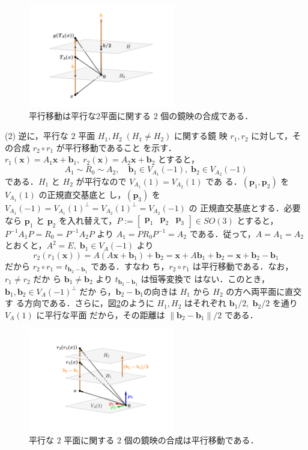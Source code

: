 \documentclass[11pt, uplatex, dvipdfmx, titlepage]{jsarticle}
\makeatletter
\renewenvironment{proof}[1][\proofname]{\par
  \pushQED{\qed}%
  \normalfont \topsep6\p@\@plus6\p@\relax
  \trivlist
  \item[\hskip\labelsep
         \bfseries
    {#1}]\ignorespaces
}{%
  \popQED\endtrivlist\@endpefalse
}
\theoremstyle{definition}
\renewcommand{\proofname}{\textbf{証明}}
\makeatother
\begin{document}
\begin{proof}
  \begin{figure}[h]
    \centering
    \includegraphics[height=4.5cm]{pictures/translation3.pdf}
    \caption{平行移動は平行な2平面に関する $2$ 個の鏡映の合成である．}
    \label{fig:translation3}
  \end{figure}

  \noindent
  (2) 逆に，平行な $2$ 平面 $H_1, H_2 \; (H_1 \neq H_2)$ に関する鏡
  映 $r_1, r_2$ に対して，その合成 $r_2 \circ r_1$ が平行移動であること
  を示す．$r_1(\bm{x})=A_1\bm{x}+\bm{b}_1, \; r_2(\bm{x}) =
  A_2\bm{x}+\bm{b}_2$ とすると，
  \[
    A_1 \sim R_0 \sim A_2, \quad \bm{b}_1 \in V_{A_1}(-1), \; \bm{b}_2 \in V_{A_2}(-1)
  \]
  である．$H_1$ と $H_2$ が平行なので $V_{A_1}(1) = V_{A_2}(1)$ であ
  る．$(\bm{p}_1, \bm{p}_2)$ を $V_{A_1}(1)$ の正規直交基底と
  し，$(\bm{p}_3)$ を
  $V_{A_1}(-1)=V_{A_1}(1)^{\perp} = V_{A_2}(1)^{\perp}=V_{A_2}(-1)$ の
  正規直交基底とする．必要なら $\bm{p}_1$ と $\bm{p}_2$ を入れ替えて，$P:=\left[
    \begin{array}{ccc}
      \bm{p}_1 & \bm{p}_2 & \bm{p}_3
    \end{array}
  \right] \in SO(3)$ とすると，$P^{-1}A_1 P = R_0 = P^{-1}A_2 P$ より $A_1=PR_0P^{-1}=A_2$
  である．従って，$A=A_1= A_2$ とおくと，$A^2= E, \; \bm{b}_1 \in V_{A}(-1)$ より
  \[
    r_2 \left( r_1 (\bm{x})\right) = A\left( A \bm{x}+\bm{b}_1\right) + \bm{b}_2
    = \bm{x} + A \bm{b}_1 + \bm{b}_2 = \bm{x} + \bm{b}_2 - \bm{b}_1
  \]
  だから $r_2 \circ r_1 = t_{\bm{b}_2-\bm{b}_1}$ である．すなわ
  ち，$r_2 \circ r_1$ は平行移動である．なお，$r_1 \neq r_2$ だか
  ら $\bm{b}_1 \neq \bm{b}_2$ より $t_{\bm{b}_2-\bm{b}_1}$ は恒等変換で
  はない．このとき，$\bm{b}_1, \bm{b}_2 \in V_{A}(-1)^{\perp}$ だか
  ら，$\bm{b}_2-\bm{b}_1$の向きは $H_1$ から $H_2$ の方へ両平面に直交す
  る方向である．さらに，図\ref{fig:translation3gen}のように $H_1, H_2$
  はそれぞれ $\bm{b}_1/2, \; \bm{b}_2/2$ を通り $V_{A}(1)$ に平行な平面
  だから，その距離は $\|\bm{b}_2-\bm{b}_1\|/2$ である．
  \begin{figure}[h]
    \centering
    \includegraphics[height=4.5cm]{pictures/translation3gen.pdf}
    \caption{平行な $2$ 平面に関する $2$ 個の鏡映の合成は平行移動である．}
    \label{fig:translation3gen}
  \end{figure}
\end{proof}
\end{document}
